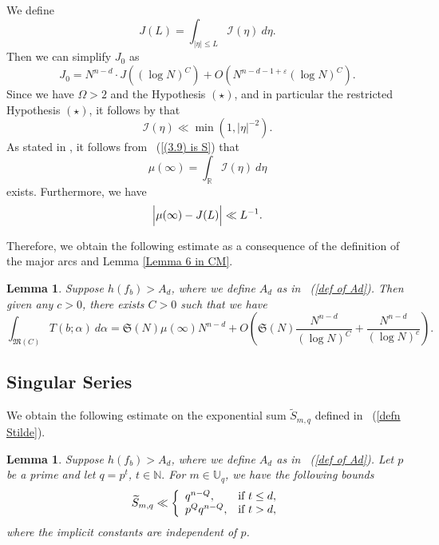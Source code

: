 \documentclass[12pt]{amsart}
\newtheorem{lem}[thm]{Lemma}
\theoremstyle{definition}
\theoremstyle{remark}
\numberwithin{equation}{section}
\begin{document}
We define
$$
J(L) = \int_{|\eta| \leq L } \mathcal{I}(\eta) \ d \eta.
$$
Then we can simplify $J_0$ as
$$
J_0 = N^{n-d} \cdot J( (\log N)^C ) + O(N^{n-d-1 + \varepsilon} (\log N)^C).
$$
Since we have $\Omega > 2$ and the Hypothesis $(\star)$, and in particular the restricted Hypothesis $(\star)$,
it follows by \cite[Lemma 8.1]{S} that
\begin{equation}
\label{(3.9) is S}
\mathcal{I}( {\eta}) \ll \min (1 , |{\eta}|^{-2} ).
\end{equation}
As stated in \cite[Section 3]{S}, it follows from ~(\ref{(3.9) is S}) that
$$
\mu(\infty) = \int_{\mathbb{R}} \mathcal{I}( {\eta}) \ d {\eta}
$$
exists.
Furthermore, we have
\begin{equation}
\label{(3.9') is S}
\Big{|} \mu(\infty) - J(L) \Big{|} \ll L^{- 1}.
\end{equation}

Therefore, we obtain the following estimate as a consequence of the definition of the major arcs and Lemma \ref{Lemma 6 in CM}.
\begin{lem}
\label{lemma major arc estimate}
Suppose $h(f_b) > A_d$, where we define $A_d$ as in ~(\ref{def of Ad}). Then given any $c>0$, there exists $C>0$  such that we have
$$
\int_{\mathfrak{M}(C) }T({b}; {\alpha} ) \ {d} {\alpha}
=
\mathfrak{S}(N) \mu(\infty) N^{n - d} + O\left( \mathfrak{S}(N) \frac{ N^{n - d}}{(\log N)^C} +  \frac{N^{n - d}}{(\log N)^c} \right).
$$
\end{lem}

\subsection{Singular Series}
\label{section singular series}
We obtain the following estimate on the exponential sum $\widetilde{S}_{{m}, q }$ defined in ~(\ref{defn Stilde}).
\begin{lem}
\label{to bound local factor}
Suppose $h(f_b) > A_d$, where we define $A_d$ as in ~(\ref{def of Ad}).
Let $p$ be a prime and let $q = p^t$, $t \in \mathbb{N}.$ For $m \in \mathbb{U}_q$, we have the following bounds
\begin{eqnarray}
\notag
\widetilde{S}_{ {m}, q} \ll
\left\{
    \begin{array}{ll}
         q^{n-Q},
         &\mbox{if } t \leq d ,\\
         p^Q q^{n-Q},
         &\mbox{if } t > d,
    \end{array}
\right.
\end{eqnarray}
where the implicit constants are independent of $p$.
\end{lem}
\end{document}
